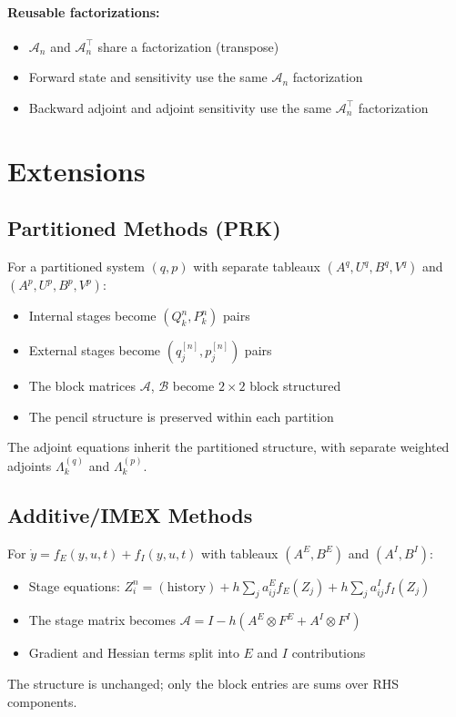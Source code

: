 \documentclass[11pt]{article}
\newcommand{\tp}{^\top}
\newcommand{\Av}{\mathcal{A}}
\newcommand{\Bv}{\mathcal{B}}
\begin{document}
\paragraph{Reusable factorizations:}
\begin{itemize}
\item $\Av_n$ and $\Av_n\tp$ share a factorization (transpose)
\item Forward state and sensitivity use the same $\Av_n$ factorization
\item Backward adjoint and adjoint sensitivity use the same $\Av_n\tp$ factorization
\end{itemize}

\section{Extensions}

\subsection{Partitioned Methods (PRK)}

For a partitioned system $(q, p)$ with separate tableaux $(A^q, U^q, B^q, V^q)$ and $(A^p, U^p, B^p, V^p)$:

\begin{itemize}
\item Internal stages become $(Q_k^n, P_k^n)$ pairs
\item External stages become $(q_j^{[n]}, p_j^{[n]})$ pairs
\item The block matrices $\Av$, $\Bv$ become $2 \times 2$ block structured
\item The pencil structure is preserved within each partition
\end{itemize}

The adjoint equations inherit the partitioned structure, with separate weighted adjoints $\Lambda_k^{(q)}$ and $\Lambda_k^{(p)}$.

\subsection{Additive/IMEX Methods}

For $\dot{y} = f_E(y,u,t) + f_I(y,u,t)$ with tableaux $(A^E, B^E)$ and $(A^I, B^I)$:

\begin{itemize}
\item Stage equations: $Z_i^n = (\text{history}) + h\sum_j a_{ij}^E f_E(Z_j) + h\sum_j a_{ij}^I f_I(Z_j)$
\item The stage matrix becomes $\Av = I - h(A^E \otimes F^E + A^I \otimes F^I)$
\item Gradient and Hessian terms split into $E$ and $I$ contributions
\end{itemize}

The structure is unchanged; only the block entries are sums over RHS components.
\end{document}
